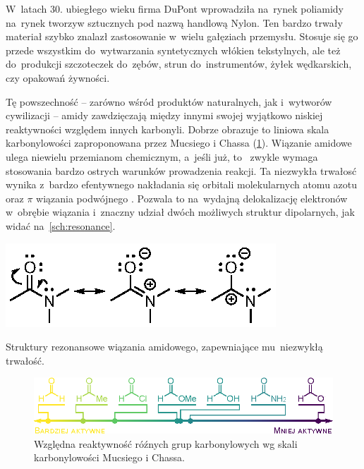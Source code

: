 W~latach 30. ubiegłego wieku firma DuPont wprowadziła na~rynek poliamidy na~rynek tworzyw sztucznych pod nazwą handlową Nylon.
Ten bardzo trwały materiał szybko znalazł zastosowanie w~wielu gałęziach przemysłu.
Stosuje się go przede wszystkim do~wytwarzania syntetycznych włókien tekstylnych,
ale też do~produkcji szczoteczek do~zębów, strun do~instrumentów, żyłek wędkarskich, czy opakowań żywności.

Tę powszechność \--- zarówno wśród produktów naturalnych, jak i~wytworów cywilizacji \---
amidy zawdzięczają między innymi swojej wyjątkowo niskiej reaktywności względem innych karbonyli.
Dobrze obrazuje to liniowa skala karbonylowości zaproponowana przez Mucsiego i Chassa (\cref{fig:carbonyl-scale})\autocite{mucsi08}.
Wiązanie amidowe ulega niewielu przemianom chemicznym, a~jeśli już, to~
zwykle wymaga stosowania bardzo ostrych warunków prowadzenia reakcji.
Ta niezwykła trwałosć wynika z~bardzo efentywnego nakładania się orbitali 
molekularnych atomu azotu oraz $\pi$ wiązania podwójnego .
Pozwala to na~wydajną delokalizację elektronów w~obrębie wiązania i~znaczny 
udział dwóch możliwych struktur dipolarnych, jak widać na~\cref{sch:resonance}.
\begin{marginscheme}
  \includegraphics{schemes/resonance}
  \caption{
    Struktury rezonansowe wiązania amidowego, zapewniające mu~niezwykłą trwałość.
  }
  \label{sch:resonance}
\end{marginscheme}

\begin{figure}
  \centering
  \includegraphics{schemes/carbonyl-scale-acc}
  \caption{
    Względna reaktywność róźnych grup karbonylowych
    wg skali karbonylowości Mucsiego i Chassa.
  }
  \label{fig:carbonyl-scale}
\end{figure}


